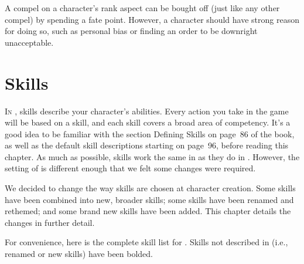\documentclass[12pt,titlepage,openany]{book}
\begin{document}
A compel on a character's rank aspect can be bought off (just like any other
compel) by spending a fate point. However, a character should have strong
reason for doing so, such as personal bias or finding an order to be downright
unacceptable.



\chapter{Skills}\label{chap:skills}

\lettrine[lines=1]{I}{n} \Fate{}, skills describe your character's abilities.
Every action you take in the game will be based on a skill, and each skill
covers a broad area of competency. It's a good idea to be familiar with the
section Defining Skills on page~86 of the \FateCore{} book, as well as the
default skill descriptions starting on page~96, before reading this chapter. As
much as possible, skills work the same in \StarTrekFate{} as they do in
\FateCore{}. However, the setting of \StarTrek{} is different enough that we
felt some changes were required.

We decided to change the way skills are chosen at character creation. Some
skills have been combined into new, broader skills; some skills have been
renamed and rethemed; and some brand new skills have been added. This chapter
details the changes in further detail.

For convenience, here is the complete skill list for \StarTrekFate{}. Skills
not described in \FateCore{} (i.e., renamed or new skills) have been bolded.
\end{document}
